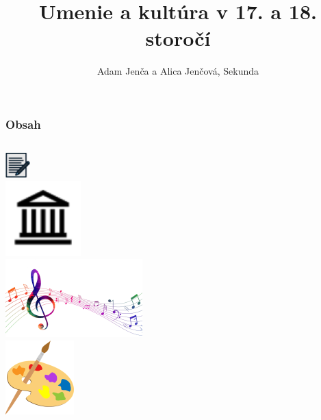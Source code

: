 \documentclass[dvipsnames]{beamer}
\title{Umenie a kultúra v 17. a 18. storočí}
\author{Adam Jenča a  Alica Jenčová, Sekunda}
\begin{document}
\begin{frame}
	\titlepage
\end{frame}
\begin{frame}
	\frametitle {Obsah}
	\begin{columns}
		\tableofcontents
		\includegraphics{book}\\
		\vskip 2mm
		\includegraphics[scale=0.4]{arch}\\
		\vskip 2mm
		\includegraphics[scale=0.4]{music}\\
		\vskip 2mm
		\includegraphics[scale=0.4]{palette}\\
	\end{columns}
\end{frame}
\end{document}
